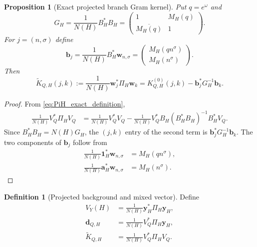 \documentclass[11pt]{amsart}
\numberwithin{equation}{section}
\theoremstyle{plain}
\newtheorem{proposition}[theorem]{Proposition}
\theoremstyle{definition}
\newtheorem{definition}[theorem]{Definition}
\theoremstyle{remark}
\newcommand{\1}{\mathbf{1}}
\begin{document}
\begin{proposition}[Exact projected branch Gram kernel]
\label{prop:schur_kernel}
Put $q=e^\omega$ and
\begin{equation}
G_H
=
\frac1{N(H)}B_H^\ast B_H
=
\begin{pmatrix}
1&M_H(q)\\
\overline{M_H(q)}&1
\end{pmatrix}.
\label{eq:joint_gram}
\end{equation}
For $j=(n,\sigma)$ define
\begin{equation}
\mathbf b_j
=
\frac1{N(H)}B_H^\ast\mathbf w_{n,\sigma}
=
\begin{pmatrix}
M_H(qn^\sigma)\\
M_H(n^\sigma)
\end{pmatrix}.
\label{eq:branch_projection_vector}
\end{equation}
Then
\begin{equation}
\boxed{
\widetilde K_{Q,H}(j,k)
:=
\frac1{N(H)}\mathbf w_j^\ast\Pi_H\mathbf w_k
=
K^{(0)}_{Q,H}(j,k)
-
\mathbf b_j^\ast G_H^{-1}\mathbf b_k.
}
\label{eq:schur_kernel_formula}
\end{equation}
\end{proposition}

\begin{proof}
From \eqref{eq:PiH_exact_definition},
\begin{align}
\frac1{N(H)}V_Q^\ast\Pi_HV_Q
&=
\frac1{N(H)}V_Q^\ast V_Q
-
\frac1{N(H)}V_Q^\ast B_H
(B_H^\ast B_H)^{-1}B_H^\ast V_Q.
\label{eq:projected_gram_matrix_expansion}
\end{align}
Since $B_H^\ast B_H=N(H)G_H$, the $(j,k)$ entry of the second term is
$\mathbf b_j^\ast G_H^{-1}\mathbf b_k$.  The two components of
$\mathbf b_j$ follow from
\begin{align}
\frac1{N(H)}\mathbf 1_H^\ast\mathbf w_{n,\sigma}
&=
M_H(qn^\sigma),
\label{eq:branch_projection_constant_component}
\\
\frac1{N(H)}\mathbf a_H^\ast\mathbf w_{n,\sigma}
&=
M_H(n^\sigma).
\label{eq:branch_projection_carrier_component}
\end{align}
\end{proof}

\begin{definition}[Projected background and mixed vector]
\label{def:background_mixed_vector}
Define
\begin{align}
V_Y(H)
&=
\frac1{N(H)}\mathbf y_H^\ast\Pi_H\mathbf y_H,
\label{eq:projected_background_energy}
\\
\mathbf d_{Q,H}
&=
\frac1{N(H)}V_Q^\ast\Pi_H\mathbf y_H,
\label{eq:mixed_background_prime_vector}
\\
\widetilde K_{Q,H}
&=
\frac1{N(H)}V_Q^\ast\Pi_HV_Q.
\label{eq:projected_prime_gram_matrix}
\end{align}
\end{definition}
\end{document}
